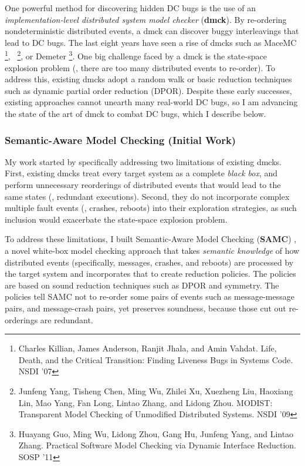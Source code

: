 \documentclass[11pt]{article}
\begin{document}
One powerful method for discovering hidden DC bugs is the use of an
\textit{implementation-level distributed system model checker} (\textbf{dmck}).
By re-ordering nondeterministic distributed events, a dmck can discover buggy
interleavings that lead to DC bugs. The last eight years have seen a rise of
dmcks such as MaceMC \footnote{Charles Killian, James Anderson, Ranjit Jhala,
and Amin Vahdat. Life, Death, and the Critical Transition: Finding Liveness Bugs
in Systems Code. NSDI '07}, \modist\ \footnote{Junfeng Yang, Tisheng Chen, Ming
Wu, Zhilei Xu, Xuezheng Liu, Haoxiang Lin, Mao Yang, Fan Long, Lintao Zhang, and
Lidong Zhou. MODIST: Transparent Model Checking of Unmodified Distributed
Systems. NSDI '09}, or Demeter \footnote{Huayang Guo, Ming Wu, Lidong Zhou, Gang
Hu, Junfeng Yang, and Lintao Zhang. Practical Software Model Checking via
Dynamic Interface Reduction. SOSP '11}. One big challenge faced by a dmck is the
state-space explosion problem (\ie, there are too many distributed events to
re-order). To address this, existing dmcks adopt a random walk or basic
reduction techniques such as dynamic partial order reduction (DPOR). Despite
these early successes, existing approaches cannot unearth many real-world DC
bugs, so I am advancing the state of the art of dmck to combat DC bugs, which I
describe below.

\subsubsection*{Semantic-Aware Model Checking (Initial Work)} 

My work started by specifically addressing two limitations of existing dmcks.
First, existing dmcks treat every target system as a complete \textit{black
box}, and perform unnecessary reorderings of distributed events that
would lead to the same states (\ie, redundant executions). Second,
they do not incorporate complex multiple fault events (\eg, crashes, reboots)
into their exploration strategies, as such inclusion would exacerbate the
state-space explosion problem.

To address these limitations, I built Semantic-Aware Model Checking
(\textbf{SAMC}) \cite{Leesatapornwongsa+15-SamcIssta,Leesatapornwongsa+14-Samc},
a novel white-box model checking approach that takes \textit{semantic knowledge}
of how distributed events (specifically, messages, crashes, and reboots) are
processed by the target system and incorporates that to create reduction
policies. The policies are based on sound reduction techniques such as DPOR and
symmetry. The policies tell SAMC not to re-order some pairs of events such as
message-message pairs, and message-crash pairs, yet preserves soundness, because
those cut out re-orderings are redundant. 
\end{document}
